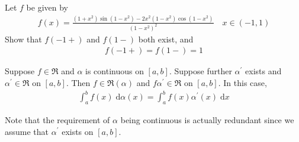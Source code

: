 \documentclass[thmcnt=section, 12pt]{elegantbook}
\begin{document}
\begin{exercise} \label{ex:1}
    Let $f$ be given by 
    \begin{align*}
        f(x)
        = \frac{(1+x^2)\sin(1-x^2) - 2x^2(1-x^2)\cos(1-x^2)}{(1-x^2)^2}
        \quad x \in (-1, 1)
    \end{align*}
    Show that $f(-1+)$ and $f(1-)$ both exist, and 
    \begin{align*}
        f(-1+) = f(1-) = 1
    \end{align*}
\end{exercise}

\begin{solution}
\end{solution}


\begin{theorem} \label{thm:46}
    Suppose $f \in \mathfrak{R}$ and $\alpha$ is continuous on $[a, b]$. Suppose further $\alpha^\prime$ exists and $\alpha^\prime \in \mathfrak{R}$ on $[a, b]$. Then $f \in \mathfrak{R}(\alpha)$ and $f \alpha^\prime \in \mathfrak{R}$ on $[a, b]$. In this case,
    \begin{align}
        \int_a^b f(x) \; \mathrm{d}\alpha(x)
        = \int_a^b f(x) \alpha^\prime(x) \; \mathrm{d}x
        \label{eq:111}
    \end{align}
\end{theorem}

\begin{remark}
    Note that the requirement of $\alpha$ being continuous is actually redundant since we assume that $\alpha^\prime$ exists on $[a, b]$. 
\end{remark}
\end{document}
